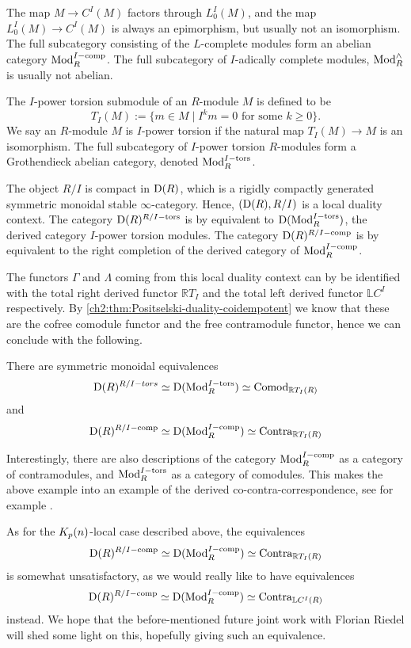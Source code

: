 The map $M\to C^I(M)$ factors through $L_0^I(M)$, and the map $L_0^I(M)\to C^I(M)$ is always an epimorphism, but usually not an isomorphism. The full subcategory consisting of the $L$-complete modules form an abelian category $\mathrm{Mod}_R^{I-\mathrm{comp}}$. The full subcategory of $I$-adically complete modules, $\mathrm{Mod}_R^\wedge$ is usually not abelian. 

The $I$-power torsion submodule of an $R$-module $M$ is defined to be 
\[T_I(M) := \{m \in M \mid I^k m = 0 \text{ for some } k\geq 0\}.\]
We say an $R$-module $M$ is $I$-power torsion if the natural map $T_I(M) \to M$ is an isomorphism. The full subcategory of $I$-power torsion $R$-modules form a Grothendieck abelian category, denoted $\mathrm{Mod}_R^{I-\mathrm{tors}}$. 

The object $R/I$ is compact in $\mathrm{D}(R)$, which is a rigidly compactly generated symmetric monoidal stable $\infty$-category. Hence, $(\mathrm{D}(R), R/I)$ is a local duality context. The category $\mathrm{D}(R)^{R/I-\mathrm{tors}}$ is by \cite[3.7(2)]{barthel-heard-valenzuela_2020} equivalent to $\mathrm{D}(\mathrm{Mod}_R^{I-\mathrm{tors}})$, the derived category $I$-power torsion modules. The category $\mathrm{D}(R)^{R/I-\mathrm{comp}}$ is by \cite[3.7(1)]{barthel-heard-valenzuela_2020} equivalent to the right completion of the derived category of $\mathrm{Mod}_R^{I-\mathrm{comp}}$. 

The functors $\Gamma$ and $\Lambda$ coming from this local duality context can by \cite[3.16]{barthel-heard-valenzuela_2018} be identified with the total right derived functor $\mathbb{R}T_I$ and the total left derived functor $\mathbb{L}C^I$ respectively. By \cref{ch2:thm:Positselski-duality-coidempotent} we know that these are the cofree comodule functor and the free contramodule functor, hence we can conclude with the following. 

\begin{proposition}
    There are symmetric monoidal equivalences
    \[\mathrm{D}(R)^{R/I-tors}\simeq \mathrm{D}(\mathrm{Mod}_R^{I-\mathrm{tors}})\simeq \mathrm{Comod}_{\mathbb{R}T_I(R)}\]
    and 
    \[\mathrm{D}(R)^{R/I-\mathrm{comp}}\simeq \mathrm{D}(\mathrm{Mod}_R^{I-\mathrm{comp}})\simeq \mathrm{Contra}_{\mathbb{R}T_I(R)}\]
\end{proposition}

Interestingly, there are also descriptions of the category $\mathrm{Mod}_R^{I-\mathrm{comp}}$ as a category of contramodules, and $\mathrm{Mod}_R^{I-\mathrm{tors}}$ as a category of comodules. This makes the above example into an example of the derived co-contra-correspondence, see for example \cite{positselski_2016}. 

As for the ${K_p(n)}$-local case described above, the equivalences
\[\mathrm{D}(R)^{R/I-\mathrm{comp}}\simeq \mathrm{D}(\mathrm{Mod}_R^{I-\mathrm{comp}})\simeq \mathrm{Contra}_{\mathbb{R}T_I(R)}\]
is somewhat unsatisfactory, as we would really like to have equivalences 
\[\mathrm{D}(R)^{R/I-\mathrm{comp}}\simeq \mathrm{D}(\mathrm{Mod}_R^{I-\mathrm{comp}})\simeq \mathrm{Contra}_{\mathbb{L}C^I(R)}\]
instead. We hope that the before-mentioned future joint work with Florian Riedel will shed some light on this, hopefully giving such an equivalence.  